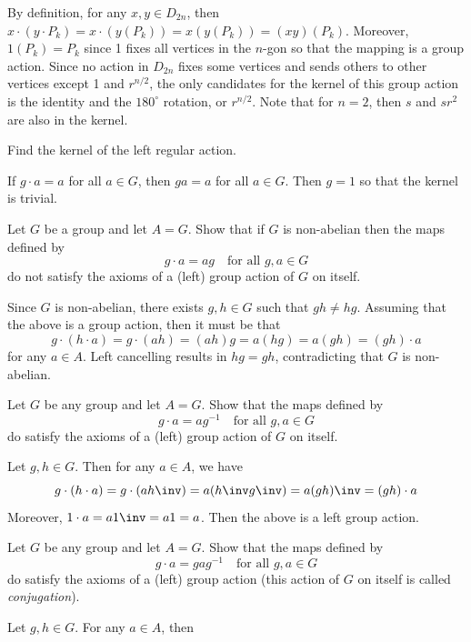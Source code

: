 \begin{problems}
\begin{sol}
        By definition, for any $x, y \in D_{2n}$, then $x \cdot (y \cdot P_k) = x \cdot (y(P_k)) = x(y(P_k)) = (xy)(P_k)$. Moreover, $1(P_k) = P_k$ since 1 fixes all vertices in the $n$-gon so that the mapping is a group action. Since no action in $D_{2n}$ fixes some vertices and sends others to other vertices except 1 and $r^{n/2}$, the only candidates for the kernel of this group action is the identity and the $180^\circ$ rotation, or $r^{n/2}$. Note that for $n = 2$, then $s$ and $sr^2$ are also in the kernel.
    \end{sol}
    \item Find the kernel of the left regular action.
    \begin{sol}
        If $g \cdot a = a$ for all $a \in G$, then $ga = a$ for all $a \in G$. Then $g = 1$ so that the kernel is trivial.
    \end{sol}
    \item Let $G$ be a group and let $A = G$. Show that if $G$ is non-abelian then the maps defined by  
    \[ g \cdot a = ag \quad \text{for all } g,a\in G \]
    do not satisfy the axioms of a (left) group action of $G$ on itself.
    \begin{sol}
        Since $G$ is non-abelian, there exists $g, h \in G$ such that $gh \neq hg$. Assuming that the above is a group action, then it must be that
        \[g \cdot (h \cdot a) = g \cdot (ah) = (ah)g = a(hg) = a(gh) = (gh) \cdot a\]
        for any $a \in A$. Left cancelling results in $hg = gh$, contradicting that $G$ is non-abelian.
    \end{sol}
    \item Let $G$ be any group and let $A = G$. Show that the maps defined by  
    \[ g \cdot a = ag^{-1} \quad \text{for all } g,a\in G \]
    do satisfy the axioms of a (left) group action of $G$ on itself.
    \begin{sol}
        Let $g, h \in G$. Then for any $a \in A$, we have
        \[g \cdot (h \cdot a) = g \cdot (ah\inv) = a(h\inv g\inv) = a(gh)\inv = (gh) \cdot a\]
        Moreover, $1 \cdot a = a1\inv = a1 = a$. Then the above is a left group action.
    \end{sol}
    \item Let $G$ be any group and let $A = G$. Show that the maps defined by  
    \[ g \cdot a = gag^{-1} \quad \text{for all } g,a\in G \]
    do satisfy the axioms of a (left) group action (this action of $G$ on itself is called \emph{conjugation}).
    \begin{sol}
        Let $g, h \in G$. For any $a \in A$, then

\end{sol}
\end{problems}
